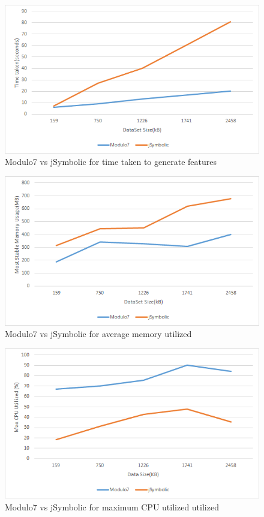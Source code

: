 \begin{figure}
\centering
\includegraphics[width=\textwidth]{TimeTaken.png}
\makeatletter
\let\@currsize\normalsize
\caption{Modulo7 vs jSymbolic for time taken to generate features}
\label{fig:time}
\end{figure}

\begin{figure}
\centering
\includegraphics[width=\textwidth]{MemoryTaken.png}
\makeatletter
\let\@currsize\normalsize
\caption{Modulo7 vs jSymbolic for average memory utilized}
\label{fig:mem}
\end{figure}

\begin{figure}
\centering
\includegraphics[width=\textwidth]{CPUUsage.png}
\makeatletter
\let\@currsize\normalsize
\caption{Modulo7 vs jSymbolic for maximum CPU utilized utilized}
\label{fig:cpu}
\end{figure}

